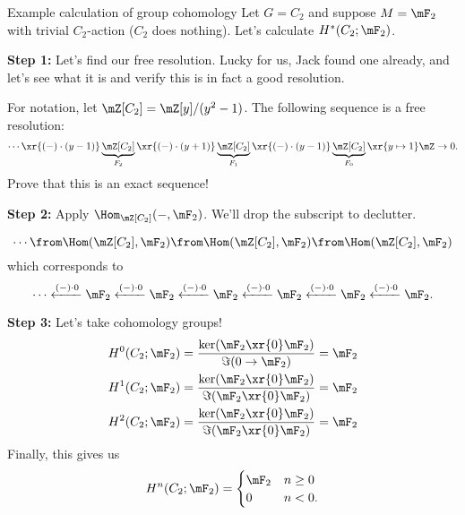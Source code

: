 \begin{example}{Example calculation of group cohomology}{}
    Let $G = C_2$ and suppose $M =\mF_2$ with trivial $C_2$-action ($C_2$ does nothing). Let's calculate $H^\ast(C_2;\mF_2)$. 

    \medskip
    \textbf{Step 1:} Let's find our free resolution. Lucky for us, Jack found one already, and let's see what it is and verify this is in fact a good resolution. 

    For notation, let $\mZ[C_2] = \mZ[y]/(y^2-1)$. The following sequence is a free resolution: 
    $$\cdots \xr{(-)\cdot(y-1)}\underbrace{\mZ[C_2]}_{F_2}\xr{(-)\cdot(y+1)}\underbrace{\mZ[C_2]}_{F_1}\xr{(-)\cdot (y-1)}\underbrace{\mZ[C_2]}_{F_0}\xr{y\mapsto 1}\mZ\to 0.$$ Prove that this is an exact sequence!

    \medskip
    \textbf{Step 2:} Apply $\Hom_{\mZ[C_2]}(-,\mF_2)$. We'll drop the subscript to declutter. 

    $$\cdots \from \Hom(\mZ[C_2],\mF_2)\from \Hom(\mZ[C_2],\mF_2)\from \Hom(\mZ[C_2],\mF_2)$$ which corresponds to $$\cdots\xleftarrow{(-)\cdot 0} \mF_2\xleftarrow{(-)\cdot 0} \mF_2\xleftarrow{(-)\cdot 0} \mF_2\xleftarrow{(-)\cdot 0} \mF_2\xleftarrow{(-)\cdot 0} \mF_2\xleftarrow{(-)\cdot 0} \mF_2.$$
    
    \medskip
    \textbf{Step 3:} Let's take cohomology groups! 
    \begin{align*}
        H^0(C_2;\mF_2)& = \frac{\ker (\mF_2\xr{0}\mF_2)}{\Im(0\to \mF_2)} = \mF_2\\
        H^1(C_2;\mF_2)& = \frac{\ker (\mF_2\xr{0}\mF_2)}{\Im(\mF_2\xr{0} \mF_2)} = \mF_2\\
        H^2(C_2;\mF_2)& = \frac{\ker (\mF_2\xr{0}\mF_2)}{\Im(\mF_2\xr{0} \mF_2)} = \mF_2\\
    \end{align*}
    Finally, this gives us $$H^n(C_2;\mF_2) = \begin{cases}
        \mF_2 & n\geq 0\\ 
        0 & n< 0.
    \end{cases}$$
\end{example}

